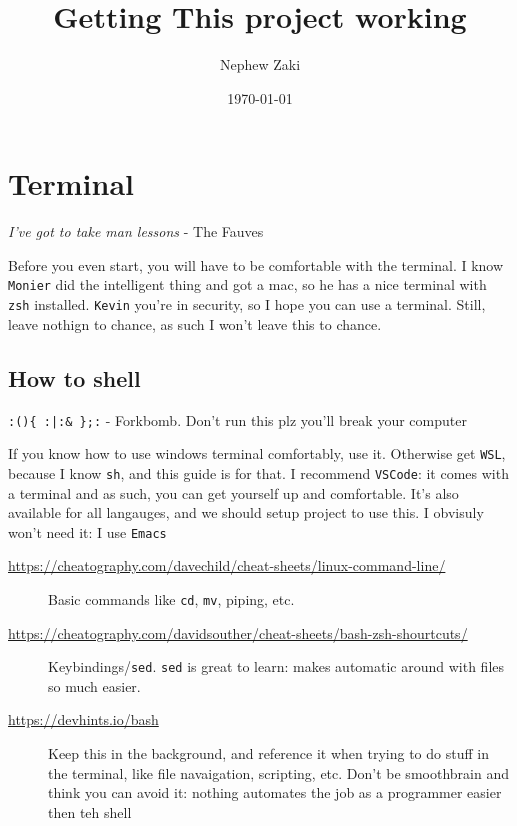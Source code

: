 \documentclass[11pt]{article}
\author{Nephew Zaki}
\date{\today}
\title{Getting This project working}
\begin{document}
\maketitle

\section*{Terminal}
\label{sec:org15011c6}
\begin{center}
\emph{I've got to take man lessons} - The Fauves
\end{center}
Before you even start, you will have to be comfortable with the terminal. I know \texttt{Monier} did the intelligent thing and got a mac, so he has a nice terminal with \texttt{zsh} installed. \texttt{Kevin} you're in security, so I hope you can use a terminal. Still, leave nothign to chance, as such I won't leave this to chance.

\subsection*{How to shell}
\label{sec:org366773a}
\begin{center}
\texttt{:()\{ :|:\& \};:}  - Forkbomb. Don't run this plz you'll break your computer
\end{center}
If you know how to use windows terminal comfortably, use it. Otherwise get \texttt{WSL}, because I know \texttt{sh}, and this guide is for that.  I recommend \texttt{VSCode}: it comes with a terminal and as such, you can get yourself up and comfortable. It's also available for all langauges, and we should setup project to use this. I obvisuly won't need it: I use \texttt{Emacs}
\begin{description}
\item[{\url{https://cheatography.com/davechild/cheat-sheets/linux-command-line/}}] Basic commands like \texttt{cd}, \texttt{mv}, piping, etc.
\item[{\url{https://cheatography.com/davidsouther/cheat-sheets/bash-zsh-shourtcuts/}}] Keybindings/​\texttt{sed}. \texttt{sed} is great to learn: makes automatic around with files so much easier.
\item[{\url{https://devhints.io/bash}}] Keep this in the background, and reference it when trying to do stuff in the terminal, like file navaigation, scripting, etc. Don't be smoothbrain and think you can avoid it: nothing automates the job as a programmer easier then teh shell
\end{description}
\end{document}
